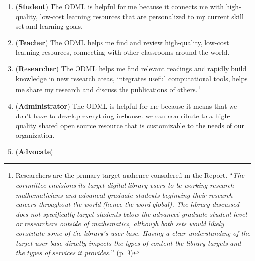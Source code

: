 \documentclass{article}
\begin{document}
\begin{enumerate}
\renewcommand{\theenumi}{\Roman{enumi}}
\item(\textbf{Student})
The ODML is helpful for me because it connects me with high-quality, low-cost learning resources that are personalized to my current skill set and learning goals.\label{student}
\item(\textbf{Teacher})
The ODML helps me find and review high-quality, low-cost learning resources, connecting with other classrooms around the world.\label{teacher}
\item(\textbf{Researcher})
\label{researcher}The ODML helps me find relevant readings and rapidly build knowledge in new research areas, integrates useful computational tools, helps me share my research and discuss the publications of others.\footnote{Researchers are the primary target audience considered in the Report. ``\emph{The committee envisions its target digital library users to be working research mathematicians and advanced graduate students beginning their research careers throughout the world (hence the word global). The library discussed does not specifically target students below the advanced graduate student level or researchers outside of mathematics, although both sets would likely constitute some of the library’s user base. Having a clear understanding of the target user base directly impacts the types of content the library targets and the types of services it provides.}'' (p. 9)}
\item(\textbf{Administrator})
The ODML is helpful for me because it means that we don't have to develop everything in-house: we can contribute to a high-quality shared open source resource that is customizable to the needs of our organization.\label{administrator} 
\item(\textbf{Advocate})

\end{enumerate}
\end{document}
